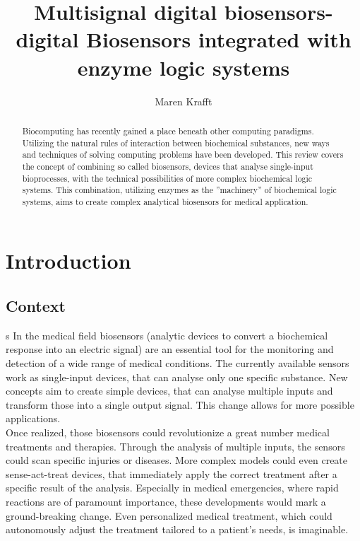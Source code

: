 \documentclass[runningheads]{llncs}
\begin{document}
\title{Multisignal digital biosensors- digital Biosensors integrated with enzyme logic systems}
\author{Maren Krafft}
\maketitle        

      
\begin{abstract}
	
Biocomputing has recently gained a place beneath other computing paradigms. Utilizing the natural rules of interaction between biochemical substances, new ways and techniques of solving computing problems have been developed. This review covers the concept of combining so called biosensors, devices that analyse single-input bioprocesses, with the technical possibilities of more complex biochemical logic systems. This combination, utilizing enzymes as the ''machinery'' of biochemical logic systems, aims to create complex analytical biosensors for medical application.



\end{abstract}


\section{Introduction}

\subsection{Context}
s
	In the medical field biosensors (analytic devices to convert a biochemical response into an electric signal) are an essential tool for the monitoring and detection of a wide range of medical conditions. The currently available sensors work as single-input devices, that can analyse only one specific substance. New concepts aim to create simple devices, that can analyse multiple inputs and transform those into a single output signal. This change allows for more possible applications.\\
	Once realized, those biosensors could revolutionize a great number medical treatments and therapies. Through the analysis of multiple inputs, the sensors could scan specific injuries or diseases. More complex models could even create sense-act-treat devices, that immediately apply the correct treatment after a specific result of the analysis. Especially in medical emergencies, where rapid reactions are of paramount importance, these developments would mark a ground-breaking change. Even personalized medical treatment, which could autonomously adjust the treatment tailored to a patient’s needs, is imaginable.
	
\end{document}
